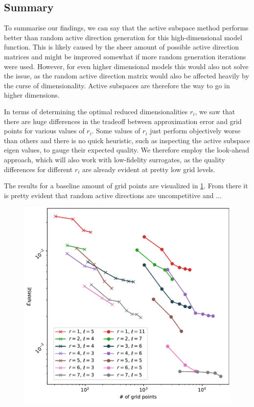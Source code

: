 \documentclass[
  a4paper,  %
  twoside,  %
  bibliography=totoc,
  headsepline,
  cleardoublepage=empty,
  parskip=half,
  draft=false
]{scrbook}
\begin{document}
\subsection{Summary}

To summarise our findings, we can say that the active subspace method performs better than random active direction generation for this high-dimensional model function.
This is likely caused by the sheer amount of possible active direction matrices and might be improved somewhat if more random generation iterations were used.
However, for even higher dimensional models this would also not solve the issue, as the random active direction matrix would also be affected heavily by the curse of dimensionality.
Active subspaces are therefore the way to go in higher dimensions.

In terms of determining the optimal reduced dimensionalities $r_i$, we saw that there are huge differences in the tradeoff between approximation error and grid points for various values of $r_i$.
Some values of $r_i$ just perform objectively worse than others and there is no quick heuristic, such as inspecting the active subspace eigen values, to gauge their expected quality.
We therefore employ the look-ahead approach, which will also work with low-fidelity surrogates, as the quality differences for different $r_i$ are already evident at pretty low grid levels.

The results for a baseline amount of grid points are visualized in \cref{fig:ww_comp}.
From there it is pretty evident that random active directions are uncompetitive and ...

\begin{mdframed}[style=style]
\begin{figure}[H]
\includegraphics[width=\textwidth]{graphics/wingweight_fixed}
\delimit
{}
\label{fig:ww_comp}
\end{figure}
\end{mdframed}
\end{document}
